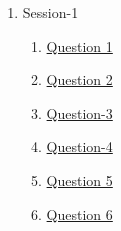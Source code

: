 \clearpage
\renewcommand{\notetitle}{Table of Contents}
\label{toc}
\begin{enumerate}

\item Session-1
\begin{enumerate}
\item \hyperref[202501120904]{Question 1}
\item \hyperref[202501121340]{Question 2}
\item \hyperref[202501121522]{Question-3}
\item \hyperref[202501121636]{Question-4}
\item \hyperref[202501121712]{Question 5}
\item \hyperref[202501121828]{Question 6}
\end{enumerate}
\end{enumerate}

\newpage
